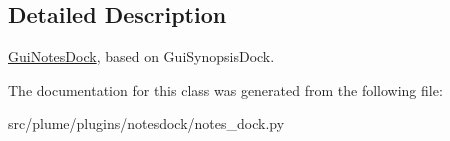 \subsection{Detailed Description}
\hyperlink{classnotes__dock_1_1_gui_notes_dock}{Gui\+Notes\+Dock}, based on Gui\+Synopsis\+Dock. 

The documentation for this class was generated from the following file\+:\begin{DoxyCompactItemize}
\item 
src/plume/plugins/notesdock/notes\+\_\+dock.\+py\end{DoxyCompactItemize}
